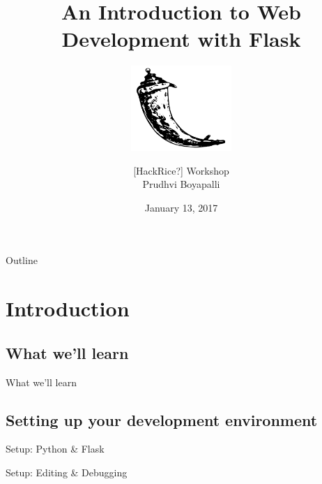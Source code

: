 \documentclass{beamer}
\title{An Introduction to Web Development with Flask}
\subtitle{\vspace{0.5in} \includegraphics[width=1.5in]{images/flask-logo.png}}
\author{[HackRice?] Workshop \\ Prudhvi Boyapalli}
\date{January 13, 2017}
\begin{document}
\begin{frame}
	\titlepage
\end{frame}

\begin{frame}[t]{Outline}
	\tableofcontents
\end{frame}

\section{Introduction}

\subsection{What we'll learn}
	\begin{frame}[t]{What we'll learn}
		
	\end{frame}

\subsection{Setting up your development environment}
	\begin{frame}[t]{Setup: Python \& Flask}
		
	\end{frame}

	\begin{frame}[t]{Setup: Editing \& Debugging}
		
	\end{frame}
\end{document}

